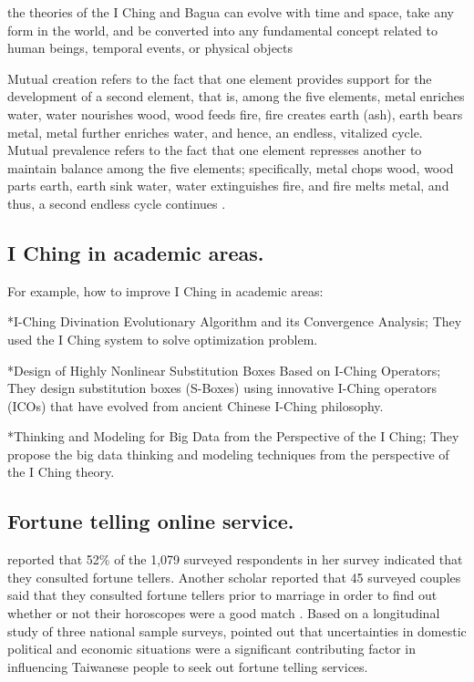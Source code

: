 \documentclass[conference]{IEEEtran}
\begin{document}
the theories of the I Ching and Bagua can evolve with time and space, take any form in the world, and be converted into any fundamental concept related to human beings, temporal events, or physical objects \cite{4}

Mutual creation refers to the fact that one element provides support for the development of a second element, that is, among the five elements, metal enriches water, water nourishes wood, wood feeds fire, fire creates
earth (ash), earth bears metal, metal further enriches water, and hence, an endless, vitalized cycle. Mutual prevalence refers to the fact that one element represses another to maintain balance among the five elements; specifically, metal chops wood, wood parts earth, earth sink water, water extinguishes fire, and fire melts metal, and thus, a second endless cycle continues \cite{5}.

\subsection{I Ching in academic areas.}
For example, how to improve I Ching in academic areas: 

*I-Ching Divination Evolutionary Algorithm and its Convergence Analysis; They used the I Ching system to solve optimization problem.

*Design of Highly Nonlinear Substitution Boxes Based on I-Ching Operators; They design substitution boxes (S-Boxes) using innovative I-Ching operators (ICOs) that have evolved from ancient Chinese I-Ching philosophy.

*Thinking and Modeling for Big Data from the Perspective of the I Ching; They propose the big
data thinking and modeling techniques from the perspective of the I Ching theory.

\subsection{Fortune telling online service.}
\cite{6}reported that 52\% of the 1,079 surveyed respondents in her survey indicated that they consulted fortune tellers. Another scholar reported that 45%
surveyed couples said that they consulted fortune tellers prior to marriage in order to
find out whether or not their horoscopes were a good match \cite{7}. Based on a
longitudinal study of three national sample surveys, \cite{8}pointed out that
uncertainties in domestic political and economic situations were a significant
contributing factor in influencing Taiwanese people to seek out fortune telling services.
\end{document}

